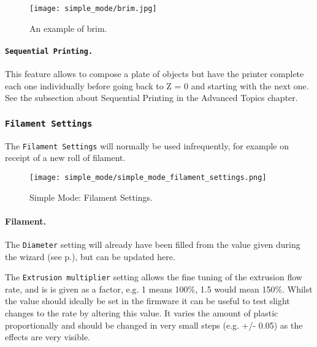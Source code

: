 \begin{figure}[H]
\centering
\texttt{[image: simple\_mode/brim.jpg]}
\caption{An example of brim.}
\label{fig:an_example_of_brim}
\end{figure}


\paragraph{\texttt{Sequential Printing.}} %
\label{par:sequential_printing}
This feature allows to compose a plate of objects but have the printer complete each one individually before going back to Z = 0 and starting with the next one. See the subsection about Sequential Printing in the Advanced Topics chapter.


\subsubsection{\texttt{Filament Settings}}

The \texttt{Filament Settings} will normally be used infrequently, for example on receipt of a new roll of filament.

\begin{figure}[H]
\centering
\texttt{[image: simple\_mode/simple\_mode\_filament\_settings.png]}
\caption{Simple Mode: Filament Settings.}
\label{fig:simple_mode_filament_settings}
\end{figure}

\paragraph{Filament.} %
\label{par:filament}
The \texttt{Diameter} setting will already have been filled from the value given during the wizard (see p.\pageref{sub:4_filament_diameter}), but can be updated here.

The \texttt{Extrusion multiplier} setting allows the fine tuning of the extrusion flow rate, and is is given as a factor, e.g. 1 means 100\%, 1.5 would mean 150\%.  Whilst the value should ideally be set in the firmware it can be useful to test slight changes to the rate by altering this value.  It varies the amount of plastic proportionally and should be changed in very small steps (e.g. +/- 0.05) as the effects are very visible.

